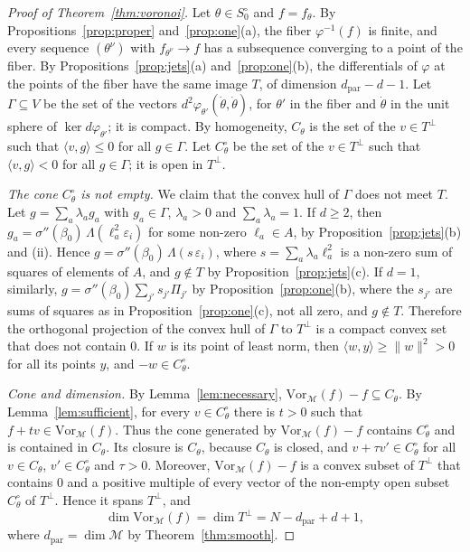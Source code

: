 \documentclass[11pt]{article}
\theoremstyle{definition}
\theoremstyle{remark}
\newcommand{\M}{\mathcal{M}}
\newcommand{\dpar}{d_{\mathrm{par}}}
\begin{document}
\begin{proof}[Proof of Theorem~\ref{thm:voronoi}]
Let $\theta\in S_0^\circ$ and $f=f_\theta$. By Propositions~\ref{prop:proper} and~\ref{prop:one}(a), the fiber $\varphi^{-1}(f)$ is finite, and every sequence $(\theta^\nu)$ with $f_{\theta^\nu}\to f$ has a subsequence converging to a point of the fiber. By Propositions~\ref{prop:jets}(a) and~\ref{prop:one}(b), the differentials of $\varphi$ at the points of the fiber have the same image $T$, of dimension $\dpar-d-1$. Let $\Gamma\subseteq V$ be the set of the vectors $d^2\varphi_{\theta'}(\dot\theta,\dot\theta)$, for $\theta'$ in the fiber and $\dot\theta$ in the unit sphere of $\ker d\varphi_{\theta'}$; it is compact. By homogeneity, $C_\theta$ is the set of the $v\in T^\perp$ such that $\langle v,g\rangle\le0$ for all $g\in\Gamma$. Let $C_\theta^\circ$ be the set of the $v\in T^\perp$ such that $\langle v,g\rangle<0$ for all $g\in\Gamma$; it is open in $T^\perp$.

\emph{The cone $C_\theta^\circ$ is not empty.} We claim that the convex hull of $\Gamma$ does not meet $T$. Let $g=\sum_a\lambda_ag_a$ with $g_a\in\Gamma$, $\lambda_a>0$ and $\sum_a\lambda_a=1$. If $d\ge2$, then $g_a=\sigma''(\beta_0)\,\Lambda(\ell_a^2\varepsilon_i)$ for some non-zero $\ell_a\in A$, by Proposition~\ref{prop:jets}(b) and (ii). Hence $g=\sigma''(\beta_0)\,\Lambda(s\,\varepsilon_i)$, where $s=\sum_a\lambda_a\ell_a^2$ is a non-zero sum of squares of elements of $A$, and $g\notin T$ by Proposition~\ref{prop:jets}(c). If $d=1$, similarly, $g=\sigma''(\beta_0)\sum_{j'}s_{j'}\Pi_{j'}$ by Proposition~\ref{prop:one}(b), where the $s_{j'}$ are sums of squares as in Proposition~\ref{prop:one}(c), not all zero, and $g\notin T$. Therefore the orthogonal projection of the convex hull of $\Gamma$ to $T^\perp$ is a compact convex set that does not contain $0$. If $w$ is its point of least norm, then $\langle w,y\rangle\ge\|w\|^2>0$ for all its points $y$, and $-w\in C_\theta^\circ$.

\emph{Cone and dimension.} By Lemma~\ref{lem:necessary}, $\mathrm{Vor}_{\M}(f)-f\subseteq C_\theta$. By Lemma~\ref{lem:sufficient}, for every $v\in C_\theta^\circ$ there is $t>0$ such that $f+tv\in\mathrm{Vor}_{\M}(f)$. Thus the cone generated by $\mathrm{Vor}_{\M}(f)-f$ contains $C_\theta^\circ$ and is contained in $C_\theta$. Its closure is $C_\theta$, because $C_\theta$ is closed, and $v+\tau v'\in C_\theta^\circ$ for all $v\in C_\theta$, $v'\in C_\theta^\circ$ and $\tau>0$. Moreover, $\mathrm{Vor}_{\M}(f)-f$ is a convex subset of $T^\perp$ that contains $0$ and a positive multiple of every vector of the non-empty open subset $C_\theta^\circ$ of $T^\perp$. Hence it spans $T^\perp$, and
\[
\dim\mathrm{Vor}_{\M}(f)=\dim T^\perp=N-\dpar+d+1,
\]
where $\dpar=\dim\M$ by Theorem~\ref{thm:smooth}.


\end{proof}
\end{document}
